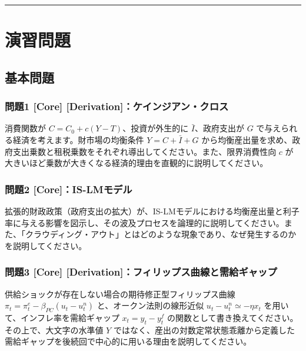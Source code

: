 \documentclass[
  japanese,
  lualatex,
  ja=standard,
  12pt,
  a4paper]{ltjsarticle}
\begin{document}
\begin{center}\rule{0.5\linewidth}{0.5pt}\end{center}

\section{演習問題}\label{ux6f14ux7fd2ux554fux984c}

\subsection{基本問題}\label{ux57faux672cux554fux984c}

\subsubsection{問題1 {[}Core{]}
{[}Derivation{]}：ケインジアン・クロス}\label{ux554fux984c1-core-derivationux30b1ux30a4ux30f3ux30b8ux30a2ux30f3ux30afux30edux30b9}

消費関数が \(C=C_0+c(Y-T)\)、投資が外生的に \(\bar{I}\)、政府支出が
\(G\) で与えられる経済を考えます。財市場の均衡条件 \(Y=C+\bar{I}+G\)
から均衡産出量を求め、政府支出乗数と租税乗数をそれぞれ導出してください。また、限界消費性向
\(c\) が大きいほど乗数が大きくなる経済的理由を直観的に説明してください。

\subsubsection{問題2
{[}Core{]}：IS-LMモデル}\label{ux554fux984c2-coreis-lmux30e2ux30c7ux30eb}

拡張的財政政策（政府支出の拡大）が、IS-LMモデルにおける均衡産出量と利子率に与える影響を図示し、その波及プロセスを論理的に説明してください。また、「クラウディング・アウト」とはどのような現象であり、なぜ発生するのかを説明してください。

\subsubsection{問題3 {[}Core{]}
{[}Derivation{]}：フィリップス曲線と需給ギャップ}\label{ux554fux984c3-core-derivationux30d5ux30a3ux30eaux30c3ux30d7ux30b9ux66f2ux7ddaux3068ux9700ux7d66ux30aeux30e3ux30c3ux30d7}

供給ショックが存在しない場合の期待修正型フィリップス曲線
\(\pi_t=\pi_t^e-\beta_{PC}(u_t-u_t^n)\) と、オークン法則の線形近似
\(u_t-u_t^n\simeq-\eta x_t\) を用いて、インフレ率を需給ギャップ
\(x_t=y_t-y_t^f\)
の関数として書き換えてください。その上で、大文字の水準値 \(Y\)
ではなく、産出の対数定常状態乖離から定義した需給ギャップを後続回で中心的に用いる理由を説明してください。
\end{document}
